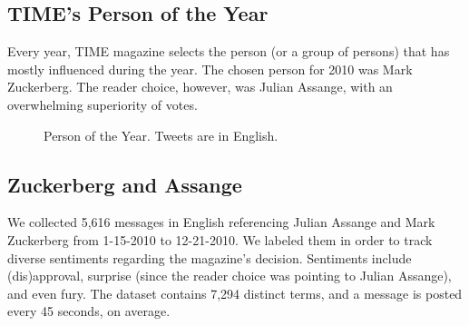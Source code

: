 \subsection{TIME's Person of the Year}

Every year, TIME magazine selects the person (or a group of persons) that
has mostly influenced during the year. The chosen person for 2010 was Mark Zuckerberg. The reader choice, however, was Julian Assange, with an overwhelming superiority of votes.

\begin{figure}[htp!]
\centering
{}
\caption{Person of the Year. Tweets are in English.}
\label{fig:assange}
\end{figure}

\subsection*{Zuckerberg and Assange}
We collected 5,616 messages in English
referencing Julian Assange and Mark Zuckerberg from 1-15-2010 to 12-21-2010.
We labeled them in order to track diverse sentiments regarding the magazine's decision. Sentiments include (dis)approval, surprise (since the reader choice was pointing to Julian Assange),
and even fury.
The dataset contains 7,294 distinct terms, and
a message is posted every 45 seconds, on average.

